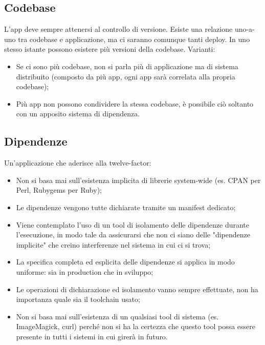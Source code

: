 \documentclass[PianoDiQualifica.tex]{subfiles}
\begin{document}
\subsection{Codebase}
L'app deve sempre attenersi al controllo di versione. Esiste una relazione uno-a-uno tra codebase e applicazione, ma ci saranno comunque tanti deploy. In uno stesso istante possono esistere più versioni della codebase.
Varianti:
\begin{itemize}
\item Se ci sono più codebase, non si parla più di applicazione ma di sistema distribuito (composto da più app, ogni app sarà correlata alla propria codebase);
\item Più app non possono condividere la stessa codebase, è possibile ciò soltanto con un apposito sistema di dipendenza.
\end{itemize}

\subsection{Dipendenze}
Un'applicazione che aderisce alla twelve-factor:
\begin{itemize}
\item Non si basa mai sull'esistenza implicita di librerie system-wide (es. CPAN per Perl, Rubygems per Ruby);
\item Le dipendenze vengono tutte dichiarate tramite un manifest dedicato;
\item Viene contemplato l'uso di un tool di isolamento delle dipendenze durante l'esecuzione, in modo tale da assicurarsi che non ci siano delle "dipendenze implicite" che creino interferenze nel sistema in cui ci si trova;
\item La specifica completa ed esplicita delle dipendenze si applica in modo uniforme: sia in production che in sviluppo;
\item Le operazioni di dichiarazione ed isolamento vanno sempre effettuate, non ha importanza quale sia il toolchain usato;
\item Non si basa mai sull'esistenza di un qualsiasi tool di sistema (es. ImageMagick, curl) perché non si ha la certezza che questo tool possa essere presente in tutti i sistemi in cui girerà in futuro.
\end{itemize}
\end{document}
